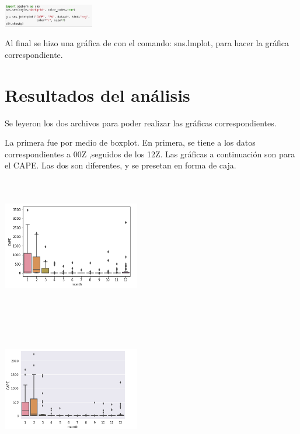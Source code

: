 \documentclass{article}
\begin{document}
\begin{center}
  \includegraphics[width=4cm, height=1cm]{dispersos.png}
\end{center}

Al final se hizo una gráfica de con el comando: sns.lmplot, para hacer la gráfica correspondiente.


\section{Resultados del análisis}

Se leyeron los dos archivos para poder realizar las gráficas correspondientes.

La primera fue por medio de boxplot. En primera, se tiene a los datos correspondientes a 00Z ,seguidos de los 12Z.
Las gráficas a continuación son para el CAPE. Las dos son diferentes, y se presetan en forma de caja.

\begin{center}
  \includegraphics[width=6cm, height=6cm]{CAPEbotGrafica.png}
\end{center}

\begin{center}
  \includegraphics[width=6cm, height=6cm]{CAPEboxGraficaZ.png}
\end{center}
\end{document}
